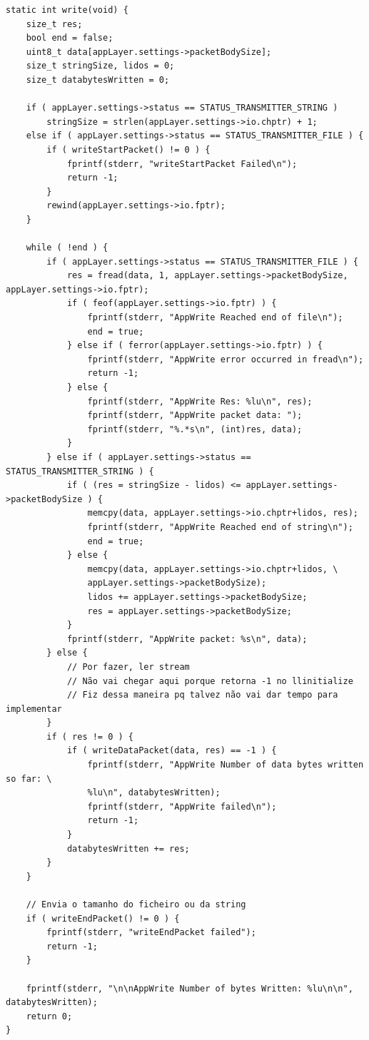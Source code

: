 \documentclass[a4paper]{article}
\begin{document}
\begin{verbatim}
static int write(void) {
    size_t res;
    bool end = false;
    uint8_t data[appLayer.settings->packetBodySize];
    size_t stringSize, lidos = 0;
    size_t databytesWritten = 0;

    if ( appLayer.settings->status == STATUS_TRANSMITTER_STRING )
        stringSize = strlen(appLayer.settings->io.chptr) + 1;
    else if ( appLayer.settings->status == STATUS_TRANSMITTER_FILE ) {
        if ( writeStartPacket() != 0 ) {
            fprintf(stderr, "writeStartPacket Failed\n");
            return -1;
        }
        rewind(appLayer.settings->io.fptr);
    }

    while ( !end ) {
        if ( appLayer.settings->status == STATUS_TRANSMITTER_FILE ) {
            res = fread(data, 1, appLayer.settings->packetBodySize, appLayer.settings->io.fptr);
            if ( feof(appLayer.settings->io.fptr) ) {
                fprintf(stderr, "AppWrite Reached end of file\n");
                end = true;
            } else if ( ferror(appLayer.settings->io.fptr) ) {
                fprintf(stderr, "AppWrite error occurred in fread\n");
                return -1;
            } else {
                fprintf(stderr, "AppWrite Res: %lu\n", res);
                fprintf(stderr, "AppWrite packet data: ");
                fprintf(stderr, "%.*s\n", (int)res, data);
            }
        } else if ( appLayer.settings->status == STATUS_TRANSMITTER_STRING ) {
            if ( (res = stringSize - lidos) <= appLayer.settings->packetBodySize ) {
                memcpy(data, appLayer.settings->io.chptr+lidos, res);
                fprintf(stderr, "AppWrite Reached end of string\n");
                end = true;
            } else {
                memcpy(data, appLayer.settings->io.chptr+lidos, \
                appLayer.settings->packetBodySize);
                lidos += appLayer.settings->packetBodySize;
                res = appLayer.settings->packetBodySize;
            }
            fprintf(stderr, "AppWrite packet: %s\n", data);
        } else {
            // Por fazer, ler stream
            // Não vai chegar aqui porque retorna -1 no llinitialize
            // Fiz dessa maneira pq talvez não vai dar tempo para implementar
        }
        if ( res != 0 ) {
            if ( writeDataPacket(data, res) == -1 ) {
                fprintf(stderr, "AppWrite Number of data bytes written so far: \
                %lu\n", databytesWritten);
                fprintf(stderr, "AppWrite failed\n");
                return -1;
            }
            databytesWritten += res;
        }
    }

    // Envia o tamanho do ficheiro ou da string
    if ( writeEndPacket() != 0 ) {
        fprintf(stderr, "writeEndPacket failed");
        return -1;
    }

    fprintf(stderr, "\n\nAppWrite Number of bytes Written: %lu\n\n", databytesWritten);
    return 0;
}
\end{verbatim}
\end{document}
